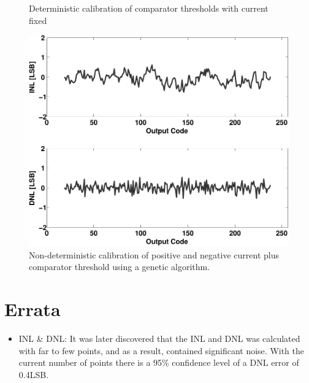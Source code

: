 {\begin{figure}[htbp]
\label{cbscfig:inl_offcal}
\caption{Deterministic calibration of comparator
 thresholds with current fixed}
\end{figure}
\begin{figure}[htbp]
\centerline{\includegraphics[width=\myfigwidth]{graphics/inl_optcal}}
 \caption{Non-deterministic calibration of positive and negative current plus
 comparator threshold using a genetic
 algorithm.}
\label{cbscfig:inl_gacal}
 \end{figure}
}

\section*{Errata}
\begin{itemize}
\item INL \& DNL: It was later discovered that the INL and DNL was
  calculated with far to few points, and as a result, contained
  significant noise. With the current number of points there is a 95\%
  confidence level of a DNL error of 0.4LSB. 
\end{itemize}



